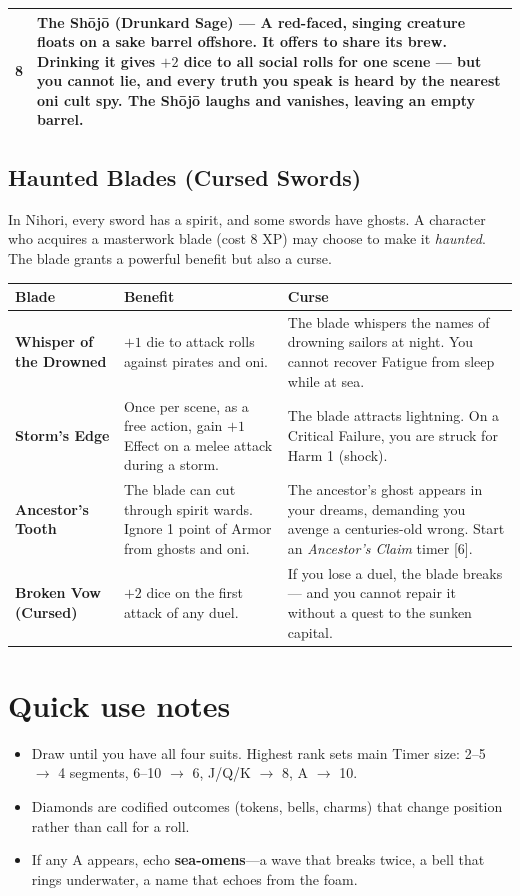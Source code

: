 \begin{longtable}{|p{1.5cm}|p{10cm}|}
\hline
8 & \textbf{The Sh{\=o}j{\=o} (Drunkard Sage)} --- A red-faced, singing creature floats on a sake barrel offshore. It offers to share its brew. Drinking it gives $+2$ dice to all social rolls for one scene --- but you cannot lie, and every truth you speak is heard by the nearest oni cult spy. The Sh{\=o}j{\=o} laughs and vanishes, leaving an empty barrel. \\
\hline
\end{longtable}

\subsection*{Haunted Blades (Cursed Swords)}
\label{sec:nihori-haunted-blades}

In Nihori, every sword has a spirit, and some swords have ghosts. A character who acquires a masterwork blade (cost 8 XP) may choose to make it \textit{haunted}. The blade grants a powerful benefit but also a curse.

\begin{longtable}{|p{2cm}|p{5cm}|p{5cm}|}
\hline
\rowcolor{gray!20}
\textbf{Blade} & \textbf{Benefit} & \textbf{Curse} \\
\hline
\textbf{Whisper of the Drowned} & $+1$ die to attack rolls against pirates and oni. & The blade whispers the names of drowning sailors at night. You cannot recover Fatigue from sleep while at sea. \\
\hline
\textbf{Storm's Edge} & Once per scene, as a free action, gain $+1$ Effect on a melee attack during a storm. & The blade attracts lightning. On a Critical Failure, you are struck for Harm 1 (shock). \\
\hline
\textbf{Ancestor's Tooth} & The blade can cut through spirit wards. Ignore 1 point of Armor from ghosts and oni. & The ancestor's ghost appears in your dreams, demanding you avenge a centuries-old wrong. Start an \textit{Ancestor's Claim} timer [6]. \\
\hline
\textbf{Broken Vow (Cursed)} & $+2$ dice on the first attack of any duel. & If you lose a duel, the blade breaks --- and you cannot repair it without a quest to the sunken capital. \\
\hline
\end{longtable}

\section*{Quick use notes}
\label{sec:nihori-quick-use}
\begin{itemize}
\item Draw until you have all four suits. Highest rank sets main Timer size: 2--5 $\rightarrow$ 4 segments, 6--10 $\rightarrow$ 6, J/Q/K $\rightarrow$ 8, A $\rightarrow$ 10.
\item Diamonds are codified outcomes (tokens, bells, charms) that change position rather than call for a roll.
\item If any A appears, echo \textbf{sea-omens}---a wave that breaks twice, a bell that rings underwater, a name that echoes from the foam.
\end{itemize}

